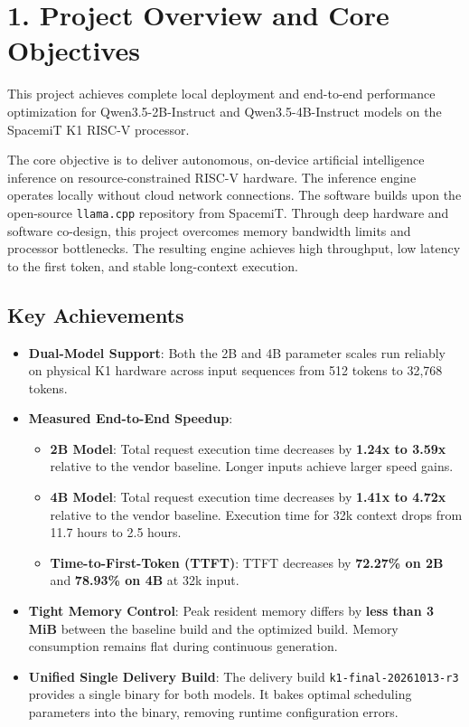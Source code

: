 \documentclass[10pt,a4paper]{article}
\begin{document}
{\small\tableofcontents}
\clearpage

\section{1. Project Overview and Core Objectives}

This project achieves complete local deployment and end-to-end performance optimization for Qwen3.5-2B-Instruct and Qwen3.5-4B-Instruct models on the SpacemiT K1 RISC-V processor.

The core objective is to deliver autonomous, on-device artificial intelligence inference on resource-constrained RISC-V hardware.
The inference engine operates locally without cloud network connections.
The software builds upon the open-source \texttt{llama.cpp} repository from SpacemiT.
Through deep hardware and software co-design, this project overcomes memory bandwidth limits and processor bottlenecks.
The resulting engine achieves high throughput, low latency to the first token, and stable long-context execution.

\subsection{Key Achievements}
\begin{itemize}
  \item \textbf{Dual-Model Support}: Both the 2B and 4B parameter scales run reliably on physical K1 hardware across input sequences from 512 tokens to 32,768 tokens.
  \item \textbf{Measured End-to-End Speedup}:
  \begin{itemize}
    \item \textbf{2B Model}: Total request execution time decreases by \textbf{1.24x to 3.59x} relative to the vendor baseline. Longer inputs achieve larger speed gains.
    \item \textbf{4B Model}: Total request execution time decreases by \textbf{1.41x to 4.72x} relative to the vendor baseline. Execution time for 32k context drops from 11.7 hours to 2.5 hours.
    \item \textbf{Time-to-First-Token (TTFT)}: TTFT decreases by \textbf{72.27\% on 2B} and \textbf{78.93\% on 4B} at 32k input.
  \end{itemize}
  \item \textbf{Tight Memory Control}: Peak resident memory differs by \textbf{less than 3 MiB} between the baseline build and the optimized build. Memory consumption remains flat during continuous generation.
  \item \textbf{Unified Single Delivery Build}: The delivery build \texttt{k1-final-20261013-r3} provides a single binary for both models. It bakes optimal scheduling parameters into the binary, removing runtime configuration errors.
\end{itemize}
\end{document}
